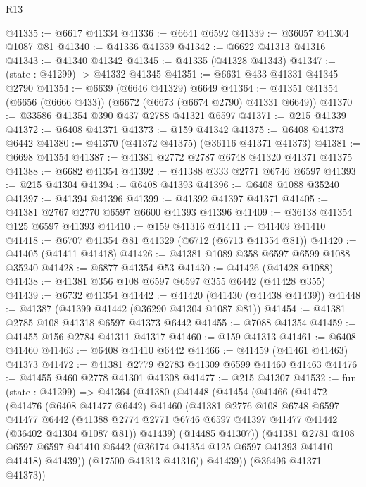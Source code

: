 \begin{lexlean}{R13}
\begin{coremodule}
@41335 := @6617 @41334
@41336 := @6641 @6592
@41339 := @36057 @41304 @1087 @81
@41340 := @41336 @41339
@41342 := @6622 @41313 @41316
@41343 := @41340 @41342
@41345 := @41335 (@41328 @41343)
@41347 := (state : @41299) -> @41332 @41345
@41351 := @6631 @433 @41331 @41345 @2790
@41354 := @6639 (@6646 @41329) @6649
@41364 := @41351 @41354 (@6656 (@6666 @433)) (@6672 (@6673 (@6674 @2790) @41331 @6649))
@41370 := @33586 @41354 @390 @437 @2788 @41321 @6597
@41371 := @215 @41339
@41372 := @6408 @41371
@41373 := @159 @41342
@41375 := @6408 @41373 @6442
@41380 := @41370 (@41372 @41375) (@36116 @41371 @41373)
@41381 := @6698 @41354
@41387 := @41381 @2772 @2787 @6748 @41320 @41371 @41375
@41388 := @6682 @41354
@41392 := @41388 @333 @2771 @6746 @6597
@41393 := @215 @41304
@41394 := @6408 @41393
@41396 := @6408 @1088 @35240
@41397 := @41394 @41396
@41399 := @41392 @41397 @41371
@41405 := @41381 @2767 @2770 @6597 @6600 @41393 @41396
@41409 := @36138 @41354 @125 @6597 @41393
@41410 := @159 @41316
@41411 := @41409 @41410
@41418 := @6707 @41354 @81 @41329 (@6712 (@6713 @41354 @81))
@41420 := @41405 (@41411 @41418)
@41426 := @41381 @1089 @358 @6597 @6599 @1088 @35240
@41428 := @6877 @41354 @53
@41430 := @41426 (@41428 @1088)
@41438 := @41381 @356 @108 @6597 @6597 @355 @6442 (@41428 @355)
@41439 := @6732 @41354
@41442 := @41420 (@41430 (@41438 @41439))
@41448 := @41387 (@41399 @41442 (@36290 @41304 @1087 @81))
@41454 := @41381 @2785 @108 @41318 @6597 @41373 @6442
@41455 := @7088 @41354
@41459 := @41455 @156 @2784 @41311 @41317
@41460 := @159 @41313
@41461 := @6408 @41460
@41463 := @6408 @41410 @6442
@41466 := @41459 (@41461 @41463) @41373
@41472 := @41381 @2779 @2783 @41309 @6599 @41460 @41463
@41476 := @41455 @460 @2778 @41301 @41308
@41477 := @215 @41307
@41532 := fun (state : @41299) =>
  @41364
    (@41380
      (@41448
        (@41454
          (@41466
            (@41472
              (@41476
                (@6408 @41477 @6442)
                @41460
                (@41381
                  @2776
                  @108
                  @6748
                  @6597
                  @41477
                  @6442
                  (@41388 @2774 @2771 @6746 @6597 @41397 @41477 @41442 (@36402 @41304 @1087 @81))
                  @41439)
                (@14485 @41307))
              (@41381
                @2781
                @108
                @6597
                @6597
                @41410
                @6442
                (@36174 @41354 @125 @6597 @41393 @41410 @41418)
                @41439))
            (@17500 @41313 @41316))
          @41439))
      (@36496 @41371 @41373))

\end{coremodule}
\end{lexlean}
